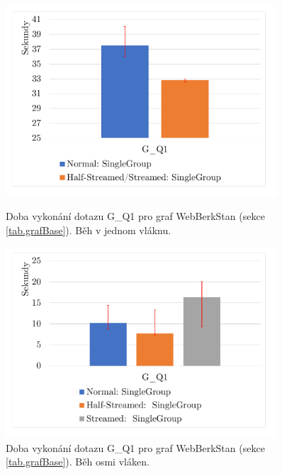 \begin{figure}[!htp]
    \centering
    \begin{minipage}{0.45\textwidth}
        \centering
        \includegraphics[width=0.9\textwidth]{../img/webberkstanGroupByQ1ST.pdf} %
        \caption{Doba vykonání dotazu G\_Q1 pro graf WebBerkStan (sekce \ref{tab.grafBase}). Běh v jednom vláknu.}
        \label{figure.webberkstanGQ1ST}
    \end{minipage}\hfill
    \begin{minipage}{0.45\textwidth}
        \centering
        \includegraphics[width=0.9\textwidth]{../img/webberkstanGroupByQ1Par.pdf} %
        \caption{Doba vykonání dotazu G\_Q1 pro graf WebBerkStan (sekce \ref{tab.grafBase}). Běh osmi vláken.}
        \label{figure.webberkstanGQ1Par}
    \end{minipage}
\end{figure}

